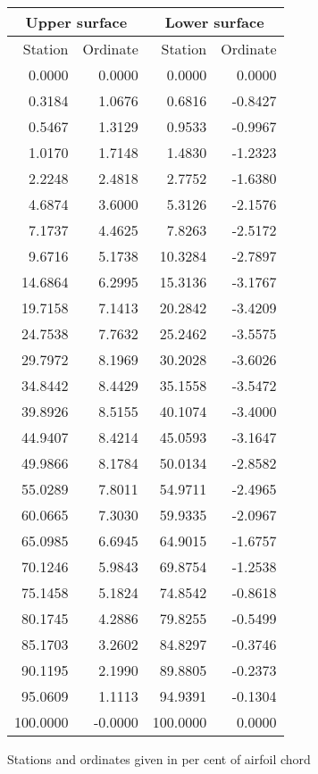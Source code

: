 \documentclass[11pt]{book}
\begin{document}
 \hspace{4mm}
 \begin{tabular}{|r|r|r|r|} \hline 
 \multicolumn{2}{|c|}{Upper surface} & \multicolumn{2}{|c|}{Lower surface} \\
 \hline
 Station & Ordinate & Station & Ordinate \\
 \hline
0.0000 & 0.0000 & 0.0000 & 0.0000 \\
0.3184 & 1.0676 & 0.6816 & -0.8427 \\
0.5467 & 1.3129 & 0.9533 & -0.9967 \\
1.0170 & 1.7148 & 1.4830 & -1.2323 \\
2.2248 & 2.4818 & 2.7752 & -1.6380 \\
4.6874 & 3.6000 & 5.3126 & -2.1576 \\
7.1737 & 4.4625 & 7.8263 & -2.5172 \\
9.6716 & 5.1738 & 10.3284 & -2.7897 \\
14.6864 & 6.2995 & 15.3136 & -3.1767 \\
19.7158 & 7.1413 & 20.2842 & -3.4209 \\
24.7538 & 7.7632 & 25.2462 & -3.5575 \\
29.7972 & 8.1969 & 30.2028 & -3.6026 \\
34.8442 & 8.4429 & 35.1558 & -3.5472 \\
39.8926 & 8.5155 & 40.1074 & -3.4000 \\
44.9407 & 8.4214 & 45.0593 & -3.1647 \\
49.9866 & 8.1784 & 50.0134 & -2.8582 \\
55.0289 & 7.8011 & 54.9711 & -2.4965 \\
60.0665 & 7.3030 & 59.9335 & -2.0967 \\
65.0985 & 6.6945 & 64.9015 & -1.6757 \\
70.1246 & 5.9843 & 69.8754 & -1.2538 \\
75.1458 & 5.1824 & 74.8542 & -0.8618 \\
80.1745 & 4.2886 & 79.8255 & -0.5499 \\
85.1703 & 3.2602 & 84.8297 & -0.3746 \\
90.1195 & 2.1990 & 89.8805 & -0.2373 \\
95.0609 & 1.1113 & 94.9391 & -0.1304 \\
100.0000 & -0.0000 & 100.0000 & 0.0000 \\
 \hline 
 \end{tabular}
 \vspace{8mm}

Stations and ordinates given in per cent of airfoil chord
\end{document}
